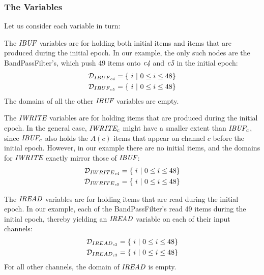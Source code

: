 \subsubsection{The Variables}

Let us consider each variable in turn:


The $\mbox{\it IBUF}$ variables are for holding both initial items and items
that are produced during the initial epoch.  In our example, the only
such nodes are the BandPassFilter's, which push 49 items onto
$\mbox{\it c4}$ and $\mbox{\it c5}$ in the initial epoch:
\begin{align*}
{\cal D}_{{IBUF}_{c4}} &= \{~i~|~0 \le i \le 48\} \\
{\cal D}_{{IBUF}_{c5}} &= \{~i~|~0 \le i \le 48\}
\end{align*}
The domains of all the other $\mbox{\it IBUF}$ variables are empty.


The $\mbox{\it IWRITE}$ variables are for holding items that are produced
during the initial epoch.  In the general case, $\mbox{\it IWRITE}_c$ might
have a smaller extent than $\mbox{\it IBUF}_c$, since $\mbox{\it IBUF}_c$ also
holds the $A(c)$ items that appear on channel $c$ before the initial
epoch.  However, in our example there are no initial items, and the
domains for $\mbox{\it IWRITE}$ exactly mirror those of $\mbox{\it IBUF}$:
\begin{align*}
{\cal D}_{{IWRITE}_{c4}} &= \{~i~|~0 \le i \le 48\} \\
{\cal D}_{{IWRITE}_{c5}} &= \{~i~|~0 \le i \le 48\}
\end{align*}

The $\mbox{\it IREAD}$ variables are for holding items that are read during
the initial epoch.  In our example, each of the BandPassFilter's read
49 items during the initial epoch, thereby yielding an $\mbox{\it IREAD}$
variable on each of their input channels:
\begin{align*}
{\cal D}_{{IREAD}_{c2}} &= \{~i~|~0 \le i \le 48 \} \\
{\cal D}_{{IREAD}_{c3}} &= \{~i~|~0 \le i \le 48 \}
\end{align*}
For all other channels, the domain of $\mbox{\it IREAD}$ is empty.


